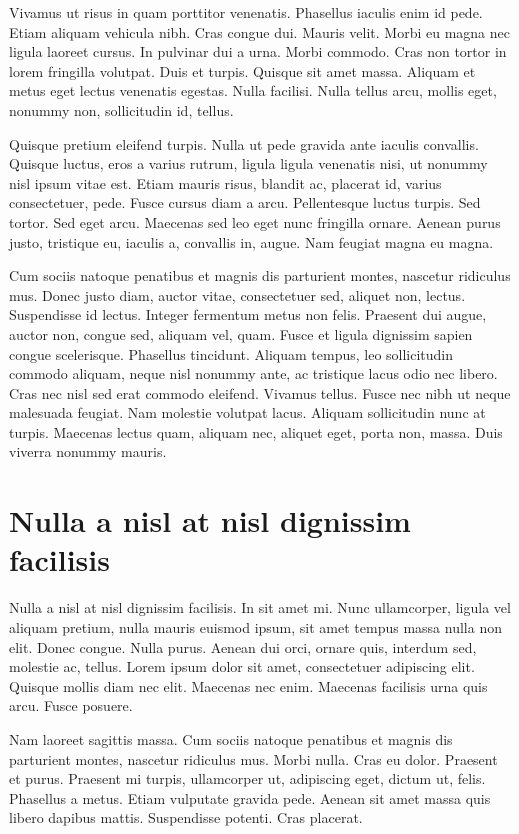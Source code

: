 Vivamus ut risus in quam porttitor venenatis. Phasellus iaculis enim
id pede. Etiam aliquam vehicula nibh. Cras congue dui. Mauris
velit. Morbi eu magna nec ligula laoreet cursus. In pulvinar dui a
urna. Morbi commodo. Cras non tortor in lorem fringilla volutpat. Duis
et turpis. Quisque sit amet massa. Aliquam et metus eget lectus
venenatis egestas. Nulla facilisi. Nulla tellus arcu, mollis eget,
nonummy non, sollicitudin id, tellus.

Quisque pretium eleifend turpis. Nulla ut pede gravida ante iaculis
convallis. Quisque luctus, eros a varius rutrum, ligula ligula
venenatis nisi, ut nonummy nisl ipsum vitae est. Etiam mauris risus,
blandit ac, placerat id, varius consectetuer, pede. Fusce cursus diam
a arcu. Pellentesque luctus turpis. Sed tortor. Sed eget
arcu. Maecenas sed leo eget nunc fringilla ornare. Aenean purus justo,
tristique eu, iaculis a, convallis in, augue. Nam feugiat magna eu
magna.

Cum sociis natoque penatibus et magnis dis parturient montes, nascetur
ridiculus mus. Donec justo diam, auctor vitae, consectetuer sed,
aliquet non, lectus. Suspendisse id lectus. Integer fermentum metus
non felis. Praesent dui augue, auctor non, congue sed, aliquam vel,
quam. Fusce et ligula dignissim sapien congue scelerisque. Phasellus
tincidunt. Aliquam tempus, leo sollicitudin commodo aliquam, neque
nisl nonummy ante, ac tristique lacus odio nec libero. Cras nec nisl
sed erat commodo eleifend. Vivamus tellus. Fusce nec nibh ut neque
malesuada feugiat. Nam molestie volutpat lacus. Aliquam sollicitudin
nunc at turpis. Maecenas lectus quam, aliquam nec, aliquet eget, porta
non, massa. Duis viverra nonummy mauris.


\chapter{Nulla a nisl at nisl dignissim facilisis}
Nulla a nisl at nisl dignissim facilisis. In sit amet mi. Nunc
ullamcorper, ligula vel aliquam pretium, nulla mauris euismod ipsum,
sit amet tempus massa nulla non elit. Donec congue. Nulla
purus. Aenean dui orci, ornare quis, interdum sed, molestie ac,
tellus. Lorem ipsum dolor sit amet, consectetuer adipiscing
elit. Quisque mollis diam nec elit. Maecenas nec enim. Maecenas
facilisis urna quis arcu. Fusce posuere.

Nam laoreet sagittis massa. Cum sociis natoque penatibus et magnis dis
parturient montes, nascetur ridiculus mus. Morbi nulla. Cras eu
dolor. Praesent et purus. Praesent mi turpis, ullamcorper ut,
adipiscing eget, dictum ut, felis. Phasellus a metus. Etiam vulputate
gravida pede. Aenean sit amet massa quis libero dapibus
mattis. Suspendisse potenti. Cras placerat.

